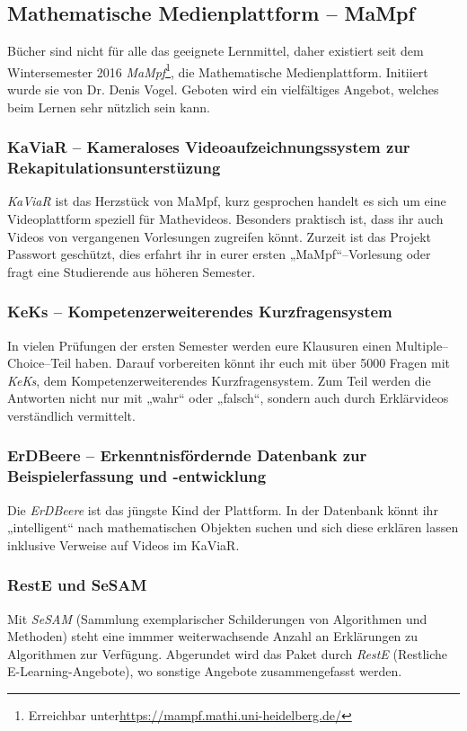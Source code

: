 \subsection{Mathematische Medienplattform -- MaMpf}
\label{mampf}

Bücher sind nicht für alle das geeignete Lernmittel, daher existiert seit dem Wintersemester 2016 \emph{MaMpf}\footnote{Erreichbar unter\url{https://mampf.mathi.uni-heidelberg.de/}}, die Mathematische Medienplattform. Initiiert wurde sie von Dr. Denis Vogel. Geboten wird ein vielfältiges Angebot, welches beim Lernen sehr nützlich sein kann.

\subsubsection{KaViaR -- Kameraloses Videoaufzeichnungssystem zur Rekapitulationsunterstüzung}
\emph{KaViaR} ist das Herzstück von MaMpf, kurz gesprochen handelt es sich um eine Videoplattform speziell für Mathevideos. Besonders praktisch ist, dass ihr auch Videos von vergangenen Vorlesungen zugreifen könnt. Zurzeit ist das Projekt  Passwort geschützt, dies erfahrt ihr in eurer ersten „MaMpf“--Vorlesung oder fragt eine Studierende aus höheren Semester.

\subsubsection{KeKs -- Kompetenzerweiterendes Kurzfragensystem}
In vielen Prüfungen der ersten Semester werden eure Klausuren einen Multiple--Choice--Teil haben.  Darauf vorbereiten könnt ihr euch mit über 5000 Fragen mit \emph{KeKs}, dem Kompetenzerweiterendes Kurzfragensystem. Zum Teil werden die Antworten nicht nur mit „wahr“ oder „falsch“, sondern auch durch Erklärvideos verständlich vermittelt.

\subsubsection{ErDBeere -- Erkenntnisfördernde Datenbank zur Beispielerfassung und -entwicklung}
 Die \emph{ErDBeere} ist das jüngste Kind der Plattform. In der Datenbank könnt ihr „intelligent“ nach mathematischen Objekten suchen und sich diese erklären lassen inklusive Verweise auf Videos im KaViaR.

\subsubsection{RestE und SeSAM}
Mit \emph{SeSAM} (Sammlung exemplarischer Schilderungen von Algorithmen und Methoden) steht eine immmer weiterwachsende Anzahl an Erklärungen zu Algorithmen zur Verfügung. Abgerundet wird das Paket durch \emph{RestE} (Restliche E-Learning-Angebote), wo sonstige Angebote zusammengefasst werden.

